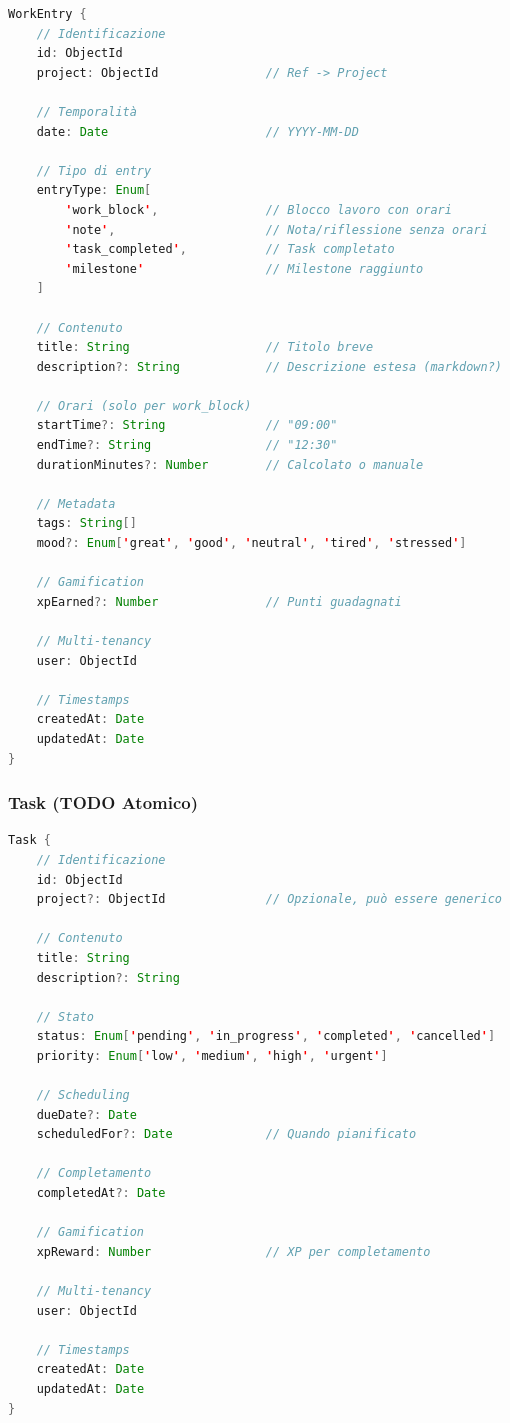 \documentclass[11pt,a4paper]{article}
\begin{document}
\begin{lstlisting}[language=Java, caption=WorkEntry Schema - Pseudocodice]
WorkEntry {
    // Identificazione
    id: ObjectId
    project: ObjectId               // Ref -> Project
    
    // Temporalità
    date: Date                      // YYYY-MM-DD
    
    // Tipo di entry
    entryType: Enum[
        'work_block',               // Blocco lavoro con orari
        'note',                     // Nota/riflessione senza orari
        'task_completed',           // Task completato
        'milestone'                 // Milestone raggiunto
    ]
    
    // Contenuto
    title: String                   // Titolo breve
    description?: String            // Descrizione estesa (markdown?)
    
    // Orari (solo per work_block)
    startTime?: String              // "09:00"
    endTime?: String                // "12:30"
    durationMinutes?: Number        // Calcolato o manuale
    
    // Metadata
    tags: String[]
    mood?: Enum['great', 'good', 'neutral', 'tired', 'stressed']
    
    // Gamification
    xpEarned?: Number               // Punti guadagnati
    
    // Multi-tenancy
    user: ObjectId
    
    // Timestamps
    createdAt: Date
    updatedAt: Date
}
\end{lstlisting}

\subsubsection{Task (TODO Atomico)}

\begin{lstlisting}[language=Java, caption=Task Schema - Pseudocodice]
Task {
    // Identificazione
    id: ObjectId
    project?: ObjectId              // Opzionale, può essere generico
    
    // Contenuto
    title: String
    description?: String
    
    // Stato
    status: Enum['pending', 'in_progress', 'completed', 'cancelled']
    priority: Enum['low', 'medium', 'high', 'urgent']
    
    // Scheduling
    dueDate?: Date
    scheduledFor?: Date             // Quando pianificato
    
    // Completamento
    completedAt?: Date
    
    // Gamification
    xpReward: Number                // XP per completamento
    
    // Multi-tenancy
    user: ObjectId
    
    // Timestamps
    createdAt: Date
    updatedAt: Date
}
\end{lstlisting}
\end{document}
